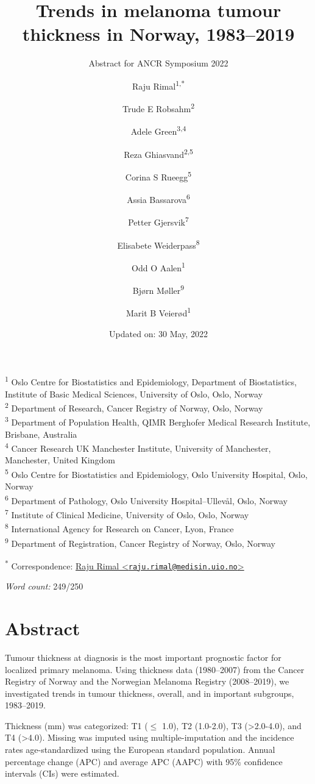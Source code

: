 \documentclass[
  11pt,
  a4paper,
]{article}
\title{Trends in melanoma tumour thickness in Norway, 1983--2019}
\subtitle{Abstract for ANCR Symposium 2022}
\author{Raju Rimal\textsuperscript{1,*} \and Trude E
Robsahm\textsuperscript{2} \and Adele
Green\textsuperscript{3,4} \and Reza
Ghiasvand\textsuperscript{2,5} \and Corina S
Rueegg\textsuperscript{5} \and Assia
Bassarova\textsuperscript{6} \and Petter
Gjersvik\textsuperscript{7} \and Elisabete
Weiderpass\textsuperscript{8} \and Odd O
Aalen\textsuperscript{1} \and Bjørn Møller\textsuperscript{9} \and Marit
B Veierød\textsuperscript{1}}
\date{Updated on: 30 May, 2022}
\begin{document}
\maketitle

\textsuperscript{1} Oslo Centre for Biostatistics and Epidemiology,
Department of Biostatistics, Institute of Basic Medical Sciences,
University of Oslo, Oslo, Norway\\
\textsuperscript{2} Department of Research, Cancer Registry of Norway,
Oslo, Norway\\
\textsuperscript{3} Department of Population Health, QIMR Berghofer
Medical Research Institute, Brisbane, Australia\\
\textsuperscript{4} Cancer Research UK Manchester Institute, University
of Manchester, Manchester, United Kingdom\\
\textsuperscript{5} Oslo Centre for Biostatistics and Epidemiology, Oslo
University Hospital, Oslo, Norway\\
\textsuperscript{6} Department of Pathology, Oslo University
Hospital--Ullevål, Oslo, Norway\\
\textsuperscript{7} Institute of Clinical Medicine, University of Oslo,
Oslo, Norway\\
\textsuperscript{8} International Agency for Research on Cancer, Lyon,
France\\
\textsuperscript{9} Department of Registration, Cancer Registry of
Norway, Oslo, Norway

\textsuperscript{*} Correspondence:
\href{mailto:raju.rimal@medisin.uio.no}{Raju Rimal
\textless{}\href{mailto:raju.rimal@medisin.uio.no}{\nolinkurl{raju.rimal@medisin.uio.no}}\textgreater{}}

\emph{Word count:} 249/250

\hypertarget{abstract}{%
\section{Abstract}\label{abstract}}

Tumour thickness at diagnosis is the most important prognostic factor
for localized primary melanoma. Using thickness data (1980--2007) from
the Cancer Registry of Norway and the Norwegian Melanoma Registry
(2008--2019), we investigated trends in tumour thickness, overall, and
in important subgroups, 1983--2019.

Thickness (mm) was categorized: T1 (\(\le\) 1.0), T2 (1.0-2.0), T3
(\textgreater2.0-4.0), and T4 (\textgreater4.0). Missing was imputed
using multiple-imputation and the incidence rates age-standardized using
the European standard population. Annual percentage change (APC) and
average APC (AAPC) with 95\% confidence intervals (CIs) were estimated.
\end{document}
